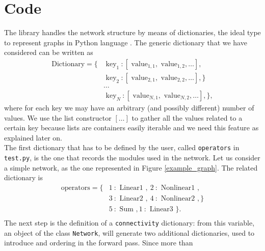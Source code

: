 \documentclass{article}
\begin{document}
\section{Code}
The library handles the network structure by means of dictionaries, the ideal type to represent graphs in Python language . The generic dictionary that we have considered can be written as
\begin{align*}
\text{Dictionary} =  \{  & \text{ key}_1  \: : [ \text{ value}_{1,1},  \text{ value}_{1,2}, \dots] ,  \\
&  \text{ key}_2  \: : [ \text{ value}_{2,1},  \text{ value}_{2,2},  \dots] , \} \\
& \dots \\
& \text{ key}_N  \: : [ \text{ value}_{N,1},  \text{ value}_{N,2},  \dots] , \},
\end{align*}
where for each key we may have an arbitrary (and possibly different) number of values. We use the list constructor $[ \dots ]$ to gather all the values related to a certain key because lists are containers easily iterable and we need this feature as explained later on. \\
The first dictionary that has to be defined by the user, called \verb|operators| in \verb|test.py|, is the one that records the modules used in the network. Let us consider a simple network, as the one represented in Figure \ref{example_graph}.
The related dictionary is
\begin{align*}
\text{operators} =  \{  & 1  \: :  \text{ Linear1 }  , \: 2  \: : \text{ Nonlinear1 }   , \\
&  3  \: :  \text{ Linear2 }   , \: 4  \: : \text{ Nonlinear2 }  , \} \\
&   5  \: :  \text{ Sum }   , 1  \: :  \text{ Linear3 }  \}.\\ 
\end{align*}
The next step is the definition of a \verb|connectivity| dictionary: from this variable, an object of the class \verb|Network|, will generate two additional dictionaries, used to introduce and ordering in the forward pass. Since more than 
\end{document}
